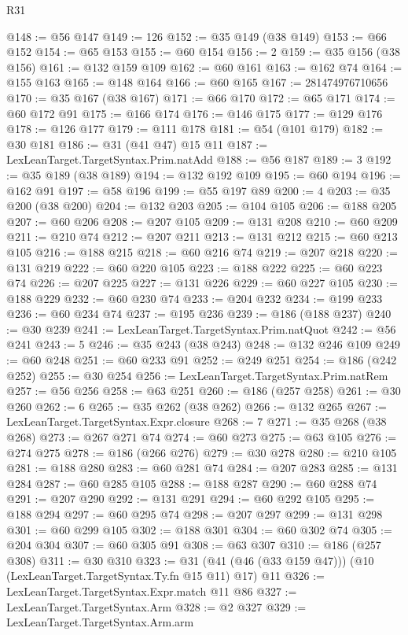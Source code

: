 \begin{lexlean}{R31}
\begin{coremodule}
@148 := @56 @147
@149 := 126
@152 := @35 @149 (@38 @149)
@153 := @66 @152
@154 := @65 @153
@155 := @60 @154
@156 := 2
@159 := @35 @156 (@38 @156)
@161 := @132 @159 @109
@162 := @60 @161
@163 := @162 @74
@164 := @155 @163
@165 := @148 @164
@166 := @60 @165
@167 := 281474976710656
@170 := @35 @167 (@38 @167)
@171 := @66 @170
@172 := @65 @171
@174 := @60 @172 @91
@175 := @166 @174
@176 := @146 @175
@177 := @129 @176
@178 := @126 @177
@179 := @111 @178
@181 := @54 (@101 @179)
@182 := @30 @181
@186 := @31 (@41 @47) @15 @11
@187 := LexLeanTarget.TargetSyntax.Prim.natAdd
@188 := @56 @187
@189 := 3
@192 := @35 @189 (@38 @189)
@194 := @132 @192 @109
@195 := @60 @194
@196 := @162 @91
@197 := @58 @196
@199 := @55 @197 @89
@200 := 4
@203 := @35 @200 (@38 @200)
@204 := @132 @203
@205 := @104 @105
@206 := @188 @205
@207 := @60 @206
@208 := @207 @105
@209 := @131 @208
@210 := @60 @209
@211 := @210 @74
@212 := @207 @211
@213 := @131 @212
@215 := @60 @213 @105
@216 := @188 @215
@218 := @60 @216 @74
@219 := @207 @218
@220 := @131 @219
@222 := @60 @220 @105
@223 := @188 @222
@225 := @60 @223 @74
@226 := @207 @225
@227 := @131 @226
@229 := @60 @227 @105
@230 := @188 @229
@232 := @60 @230 @74
@233 := @204 @232
@234 := @199 @233
@236 := @60 @234 @74
@237 := @195 @236
@239 := @186 (@188 @237)
@240 := @30 @239
@241 := LexLeanTarget.TargetSyntax.Prim.natQuot
@242 := @56 @241
@243 := 5
@246 := @35 @243 (@38 @243)
@248 := @132 @246 @109
@249 := @60 @248
@251 := @60 @233 @91
@252 := @249 @251
@254 := @186 (@242 @252)
@255 := @30 @254
@256 := LexLeanTarget.TargetSyntax.Prim.natRem
@257 := @56 @256
@258 := @63 @251
@260 := @186 (@257 @258)
@261 := @30 @260
@262 := 6
@265 := @35 @262 (@38 @262)
@266 := @132 @265
@267 := LexLeanTarget.TargetSyntax.Expr.closure
@268 := 7
@271 := @35 @268 (@38 @268)
@273 := @267 @271 @74
@274 := @60 @273
@275 := @63 @105
@276 := @274 @275
@278 := @186 (@266 @276)
@279 := @30 @278
@280 := @210 @105
@281 := @188 @280
@283 := @60 @281 @74
@284 := @207 @283
@285 := @131 @284
@287 := @60 @285 @105
@288 := @188 @287
@290 := @60 @288 @74
@291 := @207 @290
@292 := @131 @291
@294 := @60 @292 @105
@295 := @188 @294
@297 := @60 @295 @74
@298 := @207 @297
@299 := @131 @298
@301 := @60 @299 @105
@302 := @188 @301
@304 := @60 @302 @74
@305 := @204 @304
@307 := @60 @305 @91
@308 := @63 @307
@310 := @186 (@257 @308)
@311 := @30 @310
@323 := @31 (@41 (@46 (@33 @159 @47))) (@10 (LexLeanTarget.TargetSyntax.Ty.fn @15 @11) @17) @11
@326 := LexLeanTarget.TargetSyntax.Expr.match @11 @86
@327 := LexLeanTarget.TargetSyntax.Arm
@328 := @2 @327
@329 := LexLeanTarget.TargetSyntax.Arm.arm

\end{coremodule}
\end{lexlean}
